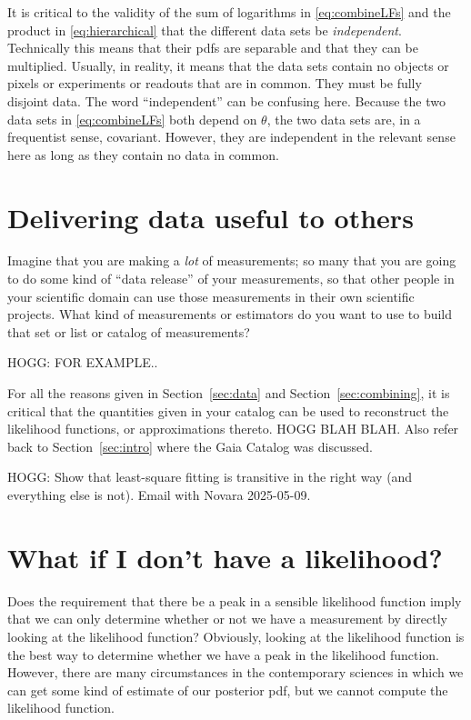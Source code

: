 \documentclass{article}
\newcommand{\sectionname}{Section}
\newcommand{\secref}[1]{\sectionname~\ref{#1}}
\begin{document}
It is critical to the validity of the sum of logarithms in \eqref{eq:combineLFs} and the product in \eqref{eq:hierarchical}
that the different data sets be \emph{independent}.
Technically this means that their pdfs are separable and that they can be multiplied.
Usually, in reality, it means that the data sets contain no objects or pixels or experiments or readouts that are in common.
They must be fully disjoint data.
The word ``independent'' can be confusing here.
Because the two data sets in \eqref{eq:combineLFs} both depend on $\theta$, the two data sets are, in a frequentist sense, covariant.
However, they are independent in the relevant sense here as long as they contain no data in common.

\section{Delivering data useful to others}\label{sec:catalogs}
Imagine that you are making a \emph{lot} of measurements; so many that you are going to do some kind of ``data release'' of your measurements, so that other people in your scientific domain can use those measurements in their own scientific projects.
What kind of measurements or estimators do you want to use to build that set or list or catalog of measurements?

HOGG: FOR EXAMPLE..

For all the reasons given in \secref{sec:data} and \secref{sec:combining}, it is critical that the quantities given in your catalog can be used to reconstruct the likelihood functions, or approximations thereto.
HOGG BLAH BLAH. Also refer back to \secref{sec:intro} where the Gaia Catalog was discussed.

HOGG: Show that least-square fitting is transitive in the right way (and everything else is not). Email with Novara 2025-05-09.

\section{What if I don't have a likelihood?}\label{sec:lfi}
Does the requirement that there be a peak in a sensible likelihood function imply that we can only determine whether or not we have a measurement by directly looking at the likelihood function?
Obviously, looking at the likelihood function is the best way to determine whether we have a peak in the likelihood function.
However, there are many circumstances in the contemporary sciences in which we can get some kind of estimate of our posterior pdf, but we cannot compute the likelihood function.
\end{document}
